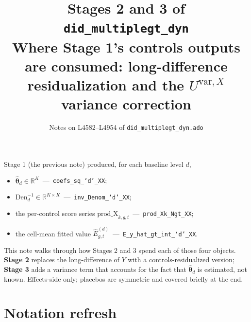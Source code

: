 \documentclass[11pt]{article}
\title{\textbf{Stages 2 and 3 of \texttt{did\_multiplegt\_dyn}}\\[2pt]
       \large Where Stage 1's controls outputs are consumed: long-difference
       residualization and the $U^{\mathrm{var},X}$ variance correction}
\author{Notes on L4582--L4954 of \texttt{did\_multiplegt\_dyn.ado}}
\date{}
\newcommand{\code}[1]{\texttt{\small #1}}
\newcommand{\R}{\mathbb{R}}
\newcommand{\1}{\mathbb{1}}
\newcommand{\thetad}{\widehat{\bm{\theta}}_d}
\begin{document}
\maketitle

\noindent
\begin{tcolorbox}[colback=codebg, colframe=navy, boxrule=0.6pt, arc=1pt]
Stage 1 (the previous note) produced, for each baseline level $d$,
\begin{itemize}[leftmargin=*, itemsep=0pt]
\item $\thetad \in \R^{K}$ \,---\, \code{coefs\_sq\_`d'\_XX};
\item $\mathrm{Den}_d^{-1} \in \R^{K\times K}$ \,---\, \code{inv\_Denom\_`d'\_XX};
\item the per-control score series $\mathrm{prod\_X}_{k,g,t}$ \,---\, \code{prod\_X{k}\_Ngt\_XX};
\item the cell-mean fitted value $\widehat{E}^{(d)}_{g,t}$ \,---\, \code{E\_y\_hat\_gt\_int\_`d'\_XX}.
\end{itemize}
This note walks through how Stages 2 and 3 spend each of those four objects.
\textbf{Stage 2} replaces the long-difference of $Y$ with a controls-residualized
version; \textbf{Stage 3} adds a variance term that accounts for the fact that
$\thetad$ is estimated, not known. Effects-side only; placebos are symmetric and
covered briefly at the end.
\end{tcolorbox}

\section{Notation refresh}
\end{document}
